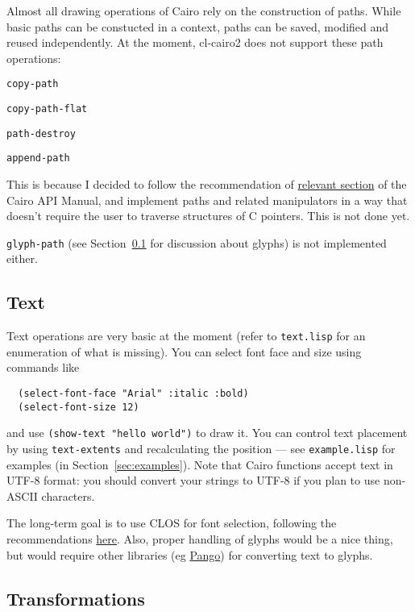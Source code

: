 \documentclass[12pt,letterpaper,dvipdfm]{article}
\begin{document}
Almost all drawing operations of Cairo rely on the construction of
paths.  While basic paths can be constucted in a context, paths can be
saved, modified and reused independently.  At the moment, cl-cairo2
does not support these path operations:
\begin{compactitem}
  \item\lstinline!copy-path!
  \item\lstinline!copy-path-flat!
  \item\lstinline!path-destroy!
  \item\lstinline!append-path!
\end{compactitem}
This is because I decided to follow the recommendation of
\href{http://www.cairographics.org/manual/bindings-path.html}{relevant
  section} of the Cairo API Manual, and implement paths and related
manipulators in a way that doesn't require the user to traverse
structures of C pointers.  This is not done yet.

\lstinline!glyph-path! (see Section~\ref{sec:text} for discussion
about glyphs) is not implemented either.

\subsection{Text}
\label{sec:text}

Text operations are very basic at the moment (refer to
\verb!text.lisp! for an enumeration of what is missing).  You can
select font face and size using commands like
\begin{lstlisting}
  (select-font-face "Arial" :italic :bold)
  (select-font-size 12)
\end{lstlisting}
and use \lstinline!(show-text "hello world")! to draw it.  You can
control text placement by using \lstinline!text-extents! and
recalculating the position --- see \verb!example.lisp! for examples
(in Section~\ref{sec:examples}).  Note that Cairo functions accept
text in UTF-8 format: you should convert your strings to UTF-8 if you
plan to use non-ASCII characters.

The long-term goal is to use CLOS for font selection, following the
recommendations
\href{http://www.cairographics.org/manual/bindings-fonts.html}{here}.
Also, proper handling of glyphs would be a nice thing, but would
require other libraries (eg \href{http://www.pango.org/}{Pango}) for
converting text to glyphs.

\subsection{Transformations}
\label{sec:transformations}
\end{document}
